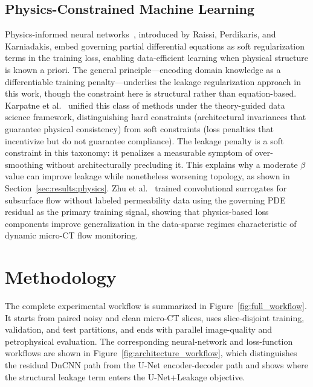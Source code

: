\documentclass[review,12pt]{elsarticle}
\begin{document}
\subsection{Physics-Constrained Machine Learning}
\label{sec:related:physics}

Physics-informed neural networks~\cite{Raissi2019}, introduced by
Raissi, Perdikaris, and Karniadakis, embed governing partial
differential equations as soft regularization terms in the training
loss, enabling data-efficient learning when physical structure is known
a priori.  The general principle---encoding domain knowledge as a
differentiable training penalty---underlies the leakage regularization
approach in this work, though the constraint here is structural rather
than equation-based.  Karpatne et al.~\cite{Karpatne2017} unified this
class of methods under the theory-guided data science framework,
distinguishing hard constraints (architectural invariances that guarantee
physical consistency) from soft constraints (loss penalties that
incentivize but do not guarantee compliance).  The leakage penalty is a
soft constraint in this taxonomy: it penalizes a measurable symptom of
over-smoothing without architecturally precluding it.  This explains why
a moderate $\beta$ value can improve leakage while nonetheless worsening
topology, as shown in Section~\ref{sec:results:physics}.  Zhu et al.\
\cite{Zhu2019} trained convolutional surrogates for subsurface flow
without labeled permeability data using the governing PDE residual as
the primary training signal, showing that physics-based loss components
improve generalization in the data-sparse regimes characteristic of
dynamic micro-CT flow monitoring.

\section{Methodology}
\label{sec:methods}

The complete experimental workflow is summarized in
Figure~\ref{fig:full_workflow}.  It starts from paired noisy and clean
micro-CT slices, uses slice-disjoint training, validation, and test
partitions, and ends with parallel image-quality and petrophysical
evaluation.  The corresponding neural-network and
loss-function workflows are shown in Figure~\ref{fig:architecture_workflow},
which distinguishes the residual DnCNN path from the U-Net
encoder-decoder path and shows where the structural leakage term enters
the U-Net+Leakage objective.
\end{document}

